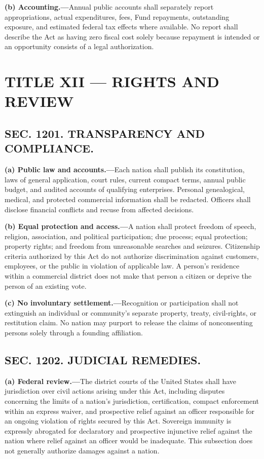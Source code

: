 \documentclass[12pt,letterpaper]{article}
\begin{document}
\textbf{(b) Accounting.---}Annual public accounts shall separately report appropriations, actual expenditures, fees, Fund repayments, outstanding exposure, and estimated federal tax effects where available. No report shall describe the Act as having zero fiscal cost solely because repayment is intended or an opportunity consists of a legal authorization.

\section*{TITLE XII --- RIGHTS AND REVIEW}

\subsection*{SEC. 1201. TRANSPARENCY AND COMPLIANCE.}

\textbf{(a) Public law and accounts.---}Each nation shall publish its constitution, laws of general application, court rules, current compact terms, annual public budget, and audited accounts of qualifying enterprises. Personal genealogical, medical, and protected commercial information shall be redacted. Officers shall disclose financial conflicts and recuse from affected decisions.

\textbf{(b) Equal protection and access.---}A nation shall protect freedom of speech, religion, association, and political participation; due process; equal protection; property rights; and freedom from unreasonable searches and seizures. Citizenship criteria authorized by this Act do not authorize discrimination against customers, employees, or the public in violation of applicable law. A person's residence within a commercial district does not make that person a citizen or deprive the person of an existing vote.

\textbf{(c) No involuntary settlement.---}Recognition or participation shall not extinguish an individual or community's separate property, treaty, civil-rights, or restitution claim. No nation may purport to release the claims of nonconsenting persons solely through a founding affiliation.

\subsection*{SEC. 1202. JUDICIAL REMEDIES.}

\textbf{(a) Federal review.---}The district courts of the United States shall have jurisdiction over civil actions arising under this Act, including disputes concerning the limits of a nation's jurisdiction, certification, compact enforcement within an express waiver, and prospective relief against an officer responsible for an ongoing violation of rights secured by this Act. Sovereign immunity is expressly abrogated for declaratory and prospective injunctive relief against the nation where relief against an officer would be inadequate. This subsection does not generally authorize damages against a nation.
\end{document}
